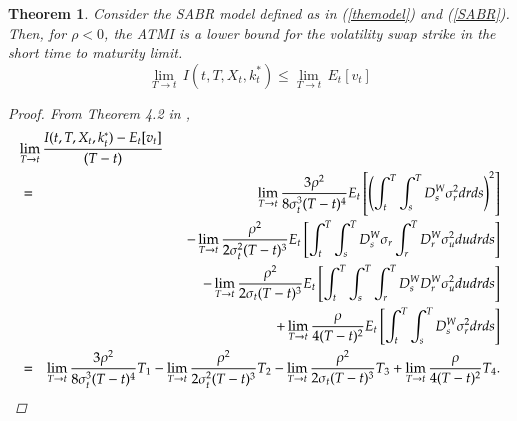 \documentclass[11pt]{article}
\newtheorem{theorem}{Theorem}
\begin{document}
\begin{theorem}\label{correlatedATMI}
Consider the SABR model defined as in (\ref{themodel}) and (\ref{SABR}). Then, for $\rho < 0$, the ATMI is a lower bound for the volatility swap strike in the short time to maturity limit.
\begin{equation}
\lim_{T \to t} \, I(t,T,X_t,k^*_t) \leq \lim_{T \to t} \,  E_{t}[v_{t}]
\end{equation}
\begin{proof}
From Theorem 4.2 in \cite{AS},
\begin{eqnarray}
\label{lim1}
\lefteqn{\lim_{T\rightarrow t}\frac{I( t,T,X_t,{k}_t^*) -E_{t}[v_{t}]} {(T-t)}}\nonumber \\
&=& \lim_{T\rightarrow t}\frac{3\rho^{2}}{8\sigma _{t}^{3}(T-t)^{4}}
E_{t}\left[\left(\int_{t}^{T}\int_{s}^{T}D_{s}^{W}\sigma _{r}^{2}dr ds\right)^{2} \right]\nonumber\\
&&-\lim_{T\rightarrow t}\frac{\rho ^{2}}{{2\sigma _{t}^2(T-t)^{3}}}
E_{t}\left[ \int_{t}^{T} \int_{s}^{T}D_{s}^{W}\sigma_{r} \int_{r}^{T}D_{r}^{W}\sigma _{u}^{2}du dr ds\right]\nonumber\\
&&-\lim_{T\rightarrow t}\frac{\rho ^{2}}{2\sigma _{t}(T-t)^{3}}
E_{t}\left[\int_{t}^{T} \int_{s}^{T}\int_{r}^{T}D_{s}^{W}D_{r}^{W}\sigma _{u}^{2}du dr ds\right]\nonumber\\
&&+\lim_{T\rightarrow t}\frac{\rho}{4(T-t)^{2}}
E_{t}\left[\int_{t}^{T}\int_{s}^{T}D_{s}^{W}\sigma _{r}^{2}dr ds \right]\nonumber\\
&=& \lim_{T\rightarrow t}\frac{3\rho^{2}}{8\sigma _{t}^{3}(T-t)^{4}}T_1 - \lim_{T\rightarrow t}\frac{\rho ^{2}}{{2\sigma _{t}^2(T-t)^{3}}} T_2 - \lim_{T\rightarrow t}\frac{\rho ^{2}}{2\sigma _{t}(T-t)^{3}} T_3 +\lim_{T\rightarrow t}\frac{\rho}{4(T-t)^{2}} T_4.
\end{eqnarray}


\end{proof}
\end{theorem}
\end{document}
